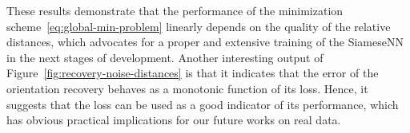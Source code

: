 These results demonstrate that the performance of the minimization scheme~\eqref{eq:global-min-problem} linearly depends on the quality of the relative distances, which advocates for a proper and extensive training of the SiameseNN in the next stages of development. Another interesting output of Figure~\ref{fig:recovery-noise-distances} is that it indicates that the error of the orientation recovery behaves as a monotonic function of its loss. Hence, it suggests that the loss can be used as a good indicator of its performance, which has obvious practical implications for our future works on real data. 